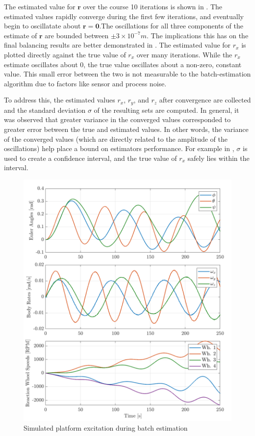 The estimated value for $\bm{r}$ over the course 10 iterations is shown in . The estimated values rapidly converge during the first few iterations, and eventually begin to oscillatate about $\bm{r}=\bm{0}$.The oscillations for all three components of the estimate of $\bm{r}$ are bounded between $\pm3\times10^{-7}m$. The implications this has on the final balancing results are better demonstrated in . The estimated value for $r_x$ is plotted directly against the true value of $r_x$ over many iterations. While the $r_x$ estimate oscillates about 0, the true value oscillates about a non-zero, constant value. This small error between the two is not measurable to the batch-estimation algorithm due to factors like sensor and process noise. 

To address this, the estimated values $r_x$, $r_y$, and $r_z$ after convergence are collected and the standard deviation $\sigma$ of the resulting sets are computed. In general, it was observed that greater variance in the converged values corresponded to greater error between the true and estimated values. In other words, the variance of the converged values (which are directly related to the amplitude of the oscillations) help place a bound on estimators performance. For example in , $\sigma$ is used to create a confidence interval, and the true value of $r_x$ safely lies within the interval.

\begin{figure}[ht]
    \centering
    \includegraphics[width=\linewidth]{plots/LSR_sim_excitation}
    \caption{Simulated platform excitation during batch estimation}
    \label{fig:LSR_sim_excitation}
\end{figure}

